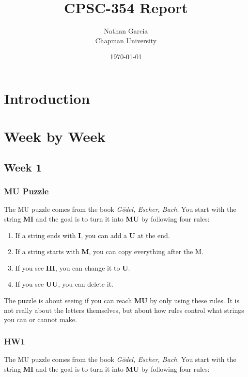 \documentclass{article}
\title{CPSC-354 Report}
\author{Nathan Garcia  \\ Chapman University}
\date{\today}
\theoremstyle{theorem}
\theoremstyle{definition}
\theoremstyle{remark}
\begin{document}
\maketitle

\begin{abstract}
\end{abstract}

\setcounter{tocdepth}{3}
\tableofcontents

\section{Introduction}\label{intro}

\section{Week by Week}\label{homework}

\subsection{Week 1}
\subsubsection{MU Puzzle}

The MU puzzle comes from the book \textit{Gödel, Escher, Bach}. You start with the string \textbf{MI} and the goal is to turn it into \textbf{MU} by following four rules:

\begin{enumerate}
    \item If a string ends with \textbf{I}, you can add a \textbf{U} at the end.  
    \item If a string starts with \textbf{M}, you can copy everything after the M.  
    \item If you see \textbf{III}, you can change it to \textbf{U}.  
    \item If you see \textbf{UU}, you can delete it.  
\end{enumerate}

The puzzle is about seeing if you can reach \textbf{MU} by only using these rules. It is not really about the letters themselves, but about how rules control what strings you can or cannot make.
\subsubsection{HW1}

The MU puzzle comes from the book \textit{Gödel, Escher, Bach}. You start with the string \textbf{MI} and the goal is to turn it into \textbf{MU} by following four rules:
\end{document}
